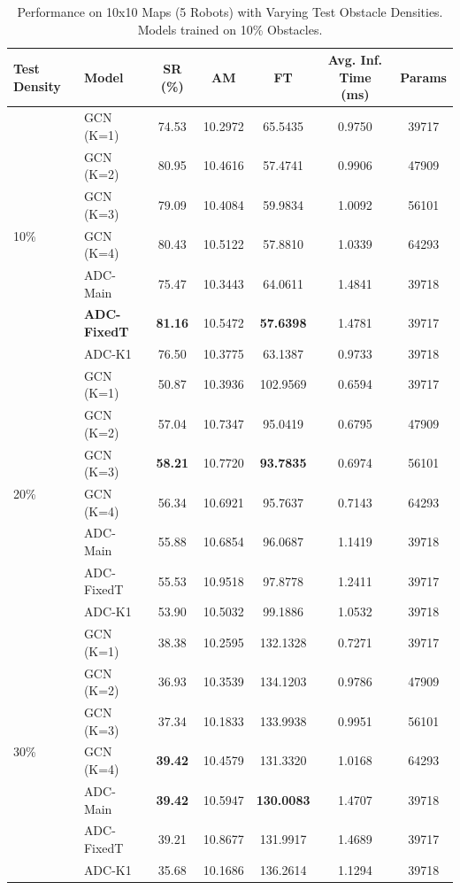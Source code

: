 \begin{table}[htbp]
    \centering
    \caption{Performance on 10x10 Maps (5 Robots) with Varying Test Obstacle Densities. Models trained on 10\% Obstacles.}
    \label{tab:density_perf_10D_train}
    \scriptsize %
    \begin{tabular}{llccccc}
        \toprule
        Test Density & Model & SR (\%) & AM & FT & Avg. Inf. Time (ms) & Params \\ %
        \midrule
        \multirow{7}{*}{10\%}
        & GCN (K=1) & 74.53 & 10.2972 & 65.5435 & 0.9750 & 39717 \\
        & GCN (K=2) & 80.95 & 10.4616 & 57.4741 & 0.9906 & 47909 \\
        & GCN (K=3) & 79.09 & 10.4084 & 59.9834 & 1.0092 & 56101 \\
        & GCN (K=4) & 80.43 & 10.5122 & 57.8810 & 1.0339 & 64293 \\
        & ADC-Main & 75.47 & 10.3443 & 64.0611 & 1.4841 & 39718 \\
        & \textbf{ADC-FixedT} & \textbf{81.16} & 10.5472 & \textbf{57.6398} & 1.4781 & 39717 \\
        & ADC-K1 & 76.50 & 10.3775 & 63.1387 & 0.9733 & 39718 \\
        \midrule
        \multirow{7}{*}{20\%}
        & GCN (K=1) & 50.87 & 10.3936 & 102.9569 & 0.6594 & 39717 \\
        & GCN (K=2) & 57.04 & 10.7347 & 95.0419 & 0.6795 & 47909 \\
        & GCN (K=3) & \textbf{58.21} & 10.7720 & \textbf{93.7835} & 0.6974 & 56101 \\
        & GCN (K=4) & 56.34 & 10.6921 & 95.7637 & 0.7143 & 64293 \\
        & ADC-Main & 55.88 & 10.6854 & 96.0687 & 1.1419 & 39718 \\
        & ADC-FixedT & 55.53 & 10.9518 & 97.8778 & 1.2411 & 39717 \\
        & ADC-K1 & 53.90 & 10.5032 & 99.1886 & 1.0532 & 39718 \\
        \midrule
        \multirow{7}{*}{30\%}
        & GCN (K=1) & 38.38 & 10.2595 & 132.1328 & 0.7271 & 39717 \\
        & GCN (K=2) & 36.93 & 10.3539 & 134.1203 & 0.9786 & 47909 \\
        & GCN (K=3) & 37.34 & 10.1833 & 133.9938 & 0.9951 & 56101 \\
        & GCN (K=4) & \textbf{39.42} & 10.4579 & 131.3320 & 1.0168 & 64293 \\
        & ADC-Main & \textbf{39.42} & 10.5947 & \textbf{130.0083} & 1.4707 & 39718 \\
        & ADC-FixedT & 39.21 & 10.8677 & 131.9917 & 1.4689 & 39717 \\
        & ADC-K1 & 35.68 & 10.1686 & 136.2614 & 1.1294 & 39718 \\
        \bottomrule
    \end{tabular}
\end{table}
